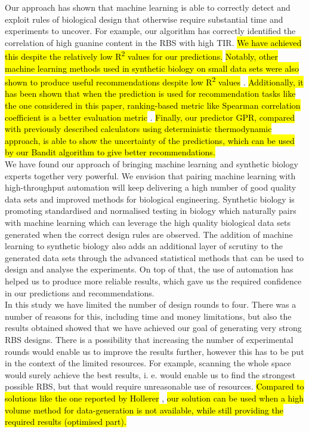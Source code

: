 \documentclass{article}
\begin{document}
Our approach has shown that machine learning is able to correctly detect and exploit rules of biological design that otherwise require substantial time and experiments to uncover.
For example, our algorithm has correctly identified the correlation of high guanine content in the RBS with high TIR.
\hl{We have achieved this despite the relatively low R\textsuperscript{2} values for our predictions.}
\hl{Notably, other machine learning methods used in synthetic biology on small data sets were also shown to produce useful recommendations despite low R\textsuperscript{2} values} \cite{Radivojevic2020, Opgenorth2019}.
\hl{Additionally, it has been shown that when the prediction is used for recommendation tasks like the one considered in this paper, ranking-based metric like Spearman correlation coefficient is a better evaluation metric}
\cite{Schober2018,  Kang2019}.
\hl{Finally, our predictor GPR, compared with previously described calculators using deterministic thermodynamic approach, is able to show the uncertainty of the predictions, which can be used by our Bandit algorithm to give better recommendations.}\\

We have found our approach of bringing machine learning and synthetic biology experts together very powerful.
We envision that pairing machine learning with high-throughput automation will keep delivering a high number of good quality data sets and improved methods for biological engineering.
Synthetic biology is promoting standardised and normalised testing in biology which naturally pairs with machine learning which can leverage the high quality biological data sets generated when the correct design rules are observed.
The addition of machine learning to synthetic biology also adds an additional layer of scrutiny to the generated data sets through the advanced statistical methods that can be used to design and analyse the experiments.
On top of that, the use of automation has helped us to produce more reliable results, which gave us the required confidence in our predictions and recommendations.\\

In this study we have limited the number of design rounds to four.
There was a number of reasons for this, including time and money limitations, but also the results obtained showed that we have achieved our goal of generating very strong RBS designs.
There is a possibility that increasing the number of experimental rounds would enable us to improve the results further, however this has to be put in the context of the limited resources.
For example, scanning the whole space would surely achieve the best results, i. e. would enable us to find the strongest possible RBS, but that would require unreasonable use of resources.
\hl{Compared to solutions like the one reported by Hollerer} \cite{Hollerer2020}, \hl{our solution can be used when a high volume method for data-generation is not available, while still providing the required results (optimised part).} \\
\end{document}
